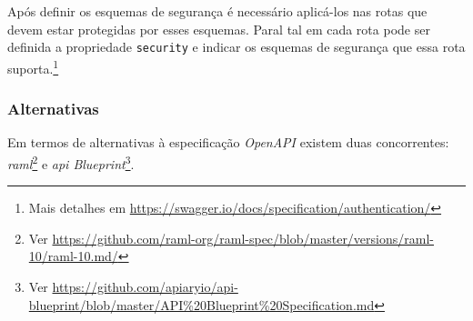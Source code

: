 Após definir os esquemas de segurança é necessário aplicá-los nas rotas que devem estar protegidas por esses esquemas. Paral tal em cada rota pode ser definida a propriedade \texttt{security} e indicar os esquemas de segurança que essa rota suporta.\footnote{Mais detalhes em \url{https://swagger.io/docs/specification/authentication/}}

\subsubsection{Alternativas}
Em termos de alternativas à especificação \textit{OpenAPI} existem duas concorrentes: \textit{\acrshort{raml}}\footnote{Ver \url{https://github.com/raml-org/raml-spec/blob/master/versions/raml-10/raml-10.md/}} e \textit{\acrshort{api} Blueprint}\footnote{Ver \url{https://github.com/apiaryio/api-blueprint/blob/master/API\%20Blueprint\%20Specification.md}}.

